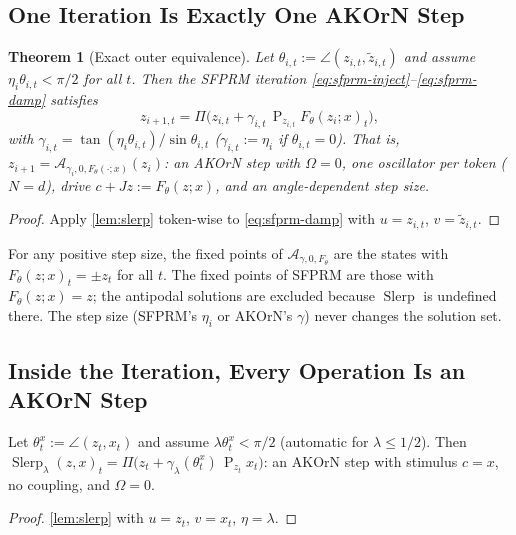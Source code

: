 \documentclass{article}
\theoremstyle{plain}
\newtheorem{theorem}{Theorem}[section]
\theoremstyle{definition}
\theoremstyle{remark}
\newcommand{\Proj}{\operatorname{P}}
\newcommand{\Ret}{\Pi}
\newcommand{\Slerp}{\operatorname{Slerp}}
\begin{document}
\subsection{One Iteration Is Exactly One AKOrN Step}

\begin{theorem}[Exact outer equivalence]
\label{thm:outer}
Let $\theta_{i,t}:=\angle(z_{i,t},\tilde z_{i,t})$ and assume $\eta_i\theta_{i,t}<\pi/2$ for all $t$.
Then the SFPRM iteration \eqref{eq:sfprm-inject}--\eqref{eq:sfprm-damp} satisfies
\begin{equation}
  z_{i+1,t} = \Ret\big(z_{i,t} + \gamma_{i,t}\,\Proj_{z_{i,t}} F_\theta(z_i;x)_t\big),
\end{equation}
with $\gamma_{i,t}=\tan(\eta_i\theta_{i,t})/\sin\theta_{i,t}$ ($\gamma_{i,t}:=\eta_i$ if
$\theta_{i,t}=0$). That is, $z_{i+1}=\mathcal A_{\gamma_i,0,F_\theta(\cdot;x)}(z_i)$: an AKOrN step
with $\Omega=0$, one oscillator per token ($N=d$), drive $c+Jz:=F_\theta(z;x)$, and an
angle-dependent step size.
\end{theorem}
\begin{proof}
Apply \cref{lem:slerp} token-wise to \eqref{eq:sfprm-damp} with $u=z_{i,t}$, $v=\tilde z_{i,t}$.
\end{proof}

\begin{corollary}
\label{cor:fixed}
For any positive step size, the fixed points of $\mathcal A_{\gamma,0,F_\theta}$ are the states with
$F_\theta(z;x)_t=\pm z_t$ for all $t$. The fixed points of SFPRM are those with $F_\theta(z;x)=z$; the
antipodal solutions are excluded because $\Slerp$ is undefined there. The step size (SFPRM's $\eta_i$
or AKOrN's $\gamma$) never changes the solution set.
\end{corollary}

\subsection{Inside the Iteration, Every Operation Is an AKOrN Step}

\begin{proposition}
\label{prop:injection}
Let $\theta^x_t:=\angle(z_t,x_t)$ and assume $\lambda\theta^x_t<\pi/2$ (automatic for $\lambda\le1/2$).
Then $\Slerp_\lambda(z,x)_t=\Ret\big(z_t+\gamma_\lambda(\theta^x_t)\,\Proj_{z_t}x_t\big)$: an AKOrN
step with stimulus $c=x$, no coupling, and $\Omega=0$.
\end{proposition}
\begin{proof}
\cref{lem:slerp} with $u=z_t$, $v=x_t$, $\eta=\lambda$.
\end{proof}
\end{document}
